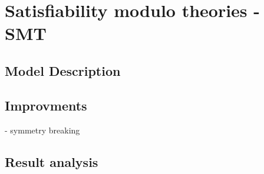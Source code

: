 \section{Satisfiability modulo theories - SMT}

\subsection{Model Description}

\subsection{Improvments}
	- symmetry breaking
\subsection{Result analysis}
\clearpage